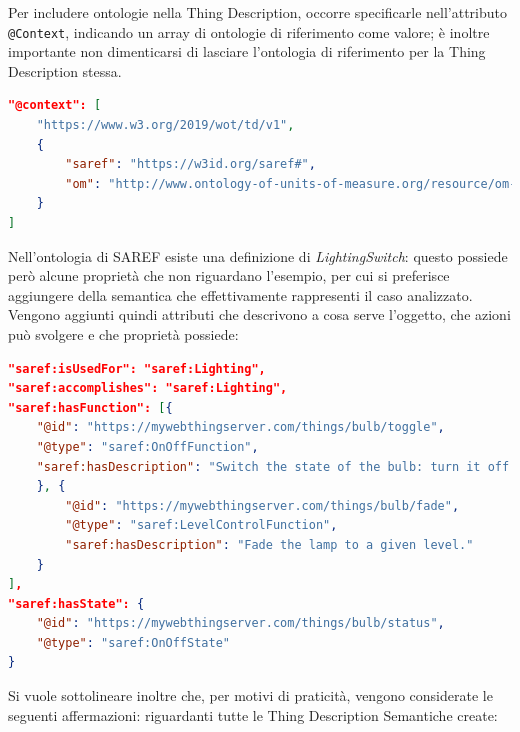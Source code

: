 \documentclass[12pt,a4paper,openright,oneside]{report}
\begin{document}
Per includere ontologie nella Thing Description, occorre specificarle nell'attributo \texttt{@Context}, indicando un array di ontologie di riferimento come valore; è inoltre importante non dimenticarsi di lasciare l'ontologia di riferimento per la Thing Description stessa.

\begin{lstlisting}[language=json,caption={Aggiunta del contesto per includere ontologie},label=lst:semantic-td1]
"@context": [
	"https://www.w3.org/2019/wot/td/v1",
	{
		"saref": "https://w3id.org/saref#",
		"om": "http://www.ontology-of-units-of-measure.org/resource/om-2/"
	}
]
\end{lstlisting}

Nell'ontologia di SAREF esiste una definizione di \textit{LightingSwitch}: questo possiede però alcune proprietà che non riguardano l'esempio, per cui si preferisce aggiungere della semantica che effettivamente rappresenti il caso analizzato. Vengono aggiunti quindi attributi che descrivono a cosa serve l'oggetto, che azioni può svolgere e che proprietà possiede:

\begin{lstlisting}[language=json,caption={Aggiunta di semantica per la lampadina},label=lst:semantic-td2]
"saref:isUsedFor": "saref:Lighting",
"saref:accomplishes": "saref:Lighting",
"saref:hasFunction": [{	
	"@id": "https://mywebthingserver.com/things/bulb/toggle",
	"@type": "saref:OnOffFunction",
	"saref:hasDescription": "Switch the state of the bulb: turn it off if on or turn it on when off."
	}, {
		"@id": "https://mywebthingserver.com/things/bulb/fade",
		"@type": "saref:LevelControlFunction",
		"saref:hasDescription": "Fade the lamp to a given level."
	}
],
"saref:hasState": {
	"@id": "https://mywebthingserver.com/things/bulb/status",
	"@type": "saref:OnOffState"
}
\end{lstlisting}

Si vuole sottolineare inoltre che, per motivi di praticità, vengono considerate le seguenti affermazioni: riguardanti tutte le Thing Description Semantiche create:
\end{document}
